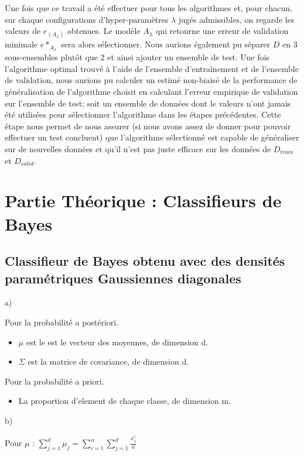 \documentclass[a4paper,10pt]{article}
\begin{document}
Une fois que ce travail a été effectuer pour tous les algorithmes et, pour chacun, sur chaque configurations d'hyper-paramètres $\lambda$ jugés admissibles, on regarde les valeurs de $e_{(A_{\lambda})}$ obtenues. Le modèle $A_{\lambda}$ qui retourne une erreur de validation minimale $e*_{A_{\lambda}}$ sera alors sélectionner. 
Nous aurions également pu séparer $D$ en 3 sous-ensembles plutôt que 2 et ainsi ajouter un ensemble de test. Une fois l'algorithme optimal trouvé à l'aide de l'ensemble d'entraînement et de l'ensemble de validation, nous aurions pu calculer un estimé non-biaisé de la performance de généralisation de l'algorithme choisit en calculant l'erreur empirique de validation sur l'ensemble de test; soit un ensemble de données dont le valeurs n'ont jamais été utilisées pour sélectionner l'algorithme dans les étapes précédentes. Cette étape nous permet de nous assurer (si nous avons assez de donner pour pouvoir effectuer un test concluent) que l'algorithme sélectionné est capable de généraliser sur de nouvelles données et qu'il n'est pas juste efficace sur les données de $D_{train}$ et $D_{valid}$.



\section{Partie Théorique : Classifieurs de Bayes}

\subsection{Classifieur de Bayes obtenu avec des densités paramétriques Gaussiennes diagonales}

a)

Pour la probabilité a postériori.
\begin{itemize}
	\item $\mu$ est le est le vecteur des moyennes, de dimension d.
	\item $\Sigma$ est la matrice de covariance, de dimension d.
\end{itemize}
Pour la probabilité a priori.
\begin{itemize}
	\item La proportion d'element de chaque classe, de dimension m.
\end{itemize}

b)

Pour $\mu$ :
$\sum_{j=1}^{d} \mu_{j} = \sum_{i=1}^{n}\sum_{j=1}^{d} \frac{x_{j}^{i}}{n}$
\end{document}
